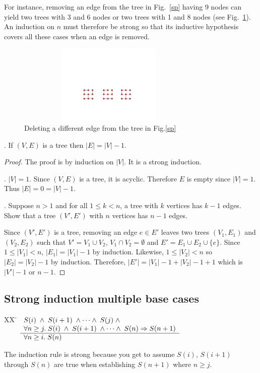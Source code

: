 \documentclass[12pt]{article}
\begin{document}
\vspace{0.5em}
\noindent For instance, removing an edge from the tree in Fig.\ \ref{sp} having 9 nodes can yield 
two trees with 3 and 6 nodes or two trees with 1 and 8 nodes (see Fig.~\ref{2sp}).
An induction on $n$ must therefore be strong so that its inductive hypothesis
covers all these cases when an edge is removed.

\begin{figure}[h]
\centering
\includegraphics[width=3.5in, height=1.5in,keepaspectratio=true]{deletededge.pdf}
\caption{Deleting a different edge from the tree in Fig.\ref{sp}}
\label{2sp}
\end{figure}

. If $(V,E)$ is a tree then $|E| = |V| - 1$.

\begin{proof}
The proof is by induction on $|V|$.
It is a strong induction.

. $|V|=1$.  Since $(V,E)$ is a tree, it is acyclic.
Therefore $E$ is empty since $|V|=1$.  Thus $|E|=0=|V|-1$.

.
Suppose $n>1$ and for all $1\leq k < n$, a tree with $k$ vertices has $k-1$ edges.
Show that a tree $(V',E')$ with $n$ vertices has $n-1$ edges.

Since $(V',E')$ is a tree, removing an edge $e\in E'$ leaves two trees
$(V_1,E_1)$ and $(V_2,E_2)$ such that $V'=V_1\cup V_2$, $V_1\cap V_2=\emptyset$ and
$E' = E_1\cup E_2\cup\{e\}$.
Since $1\leq |V_1| < n$, $|E_1|= |V_1|-1$ by induction.
Likewise, $1\leq |V_2| < n$ so $|E_2| = |V_2|-1$ by induction.
Therefore, $|E'| = |V_1| - 1 + |V_2| - 1 + 1$ which is $|V'|-1$ or $n-1$.
\end{proof}

\subsection{Strong induction multiple base cases}
\begin{tabbing}
[3]XX \=  \kill
[3] \>
	\(\begin{array}[t]{l}
	S(i) \;\wedge\; S(i+1)\;\wedge\cdots\wedge\;S(j)\;\wedge\; \\
\forall n \geq j.\;S(i)\;\wedge\;S(i+1)\;\wedge\cdots\wedge\;S(n) \Rightarrow S(n+1) \\
	\hline
	\forall n \geq i. \; S(n)
	\end{array}\) %
\end{tabbing}
The induction rule is strong because you get to assume
$S(i)$, $S(i+1)$ through $S(n)$ are true when establishing $S(n+1)$ where $n\geq j$.
\end{document}
